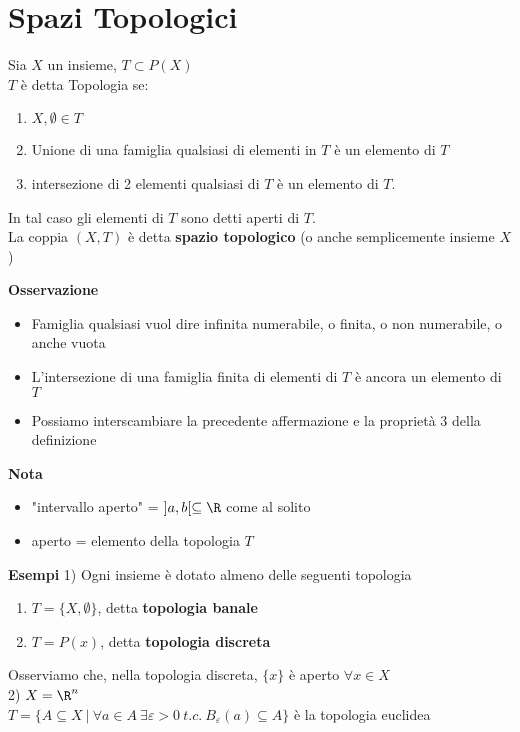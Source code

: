 \documentclass{article}
\begin{document}
	\section{Spazi Topologici}
	\begin{defi}[Topologia]
		Sia $X$ un insieme, $T\subset P(X)$\\
		 $T$ è detta Topologia se:
		 \begin{enumerate}
			 \item $X,\emptyset\in T$
			 \item Unione di una famiglia qualsiasi di elementi in  $T$ è un elemento di $T$ 
			 \item intersezione di 2 elementi qualsiasi di $T$ è un elemento di $T$.
		 \end{enumerate}
		 In tal caso gli elementi di $T$ sono detti aperti di $T$.\\
		 La coppia $(X,T)$ è detta \textbf{spazio topologico} (o anche semplicemente insieme $X$)
	\end{defi}
	\textbf{Osservazione}
	\begin{itemize}
		\item Famiglia qualsiasi vuol dire infinita numerabile, o finita, o non numerabile, o anche vuota
		\item L'intersezione di una famiglia finita di elementi di $T$ è ancora un elemento di $T$ 
		\item Possiamo interscambiare la precedente affermazione e la proprietà 3 della definizione
	\end{itemize}
	\textbf{Nota}
	\begin{itemize}
		\item "intervallo aperto" = $]a,b[\subseteq\R$ come al solito
		\item aperto = elemento della topologia $T$
	\end{itemize}
	\textbf{Esempi}
	1) Ogni insieme è dotato almeno delle seguenti topologia
	\begin{enumerate}
		\item $T = \{X,\emptyset\}$, detta \textbf{topologia banale}
		\item $T = P(x)$, detta \textbf{topologia discreta}
	\end{enumerate}
	Osserviamo che, nella topologia discreta, $\{x\}$ è aperto $\forall x\in X$\\
	2)  $X = \R^n$\\
	$T = \{ A\subseteq X \ | \ \forall a\in A \ \exists \varepsilon > 0 \ t.c. \ B_\varepsilon(a)\subseteq A\}$ è la topologia euclidea\\
\end{document}
